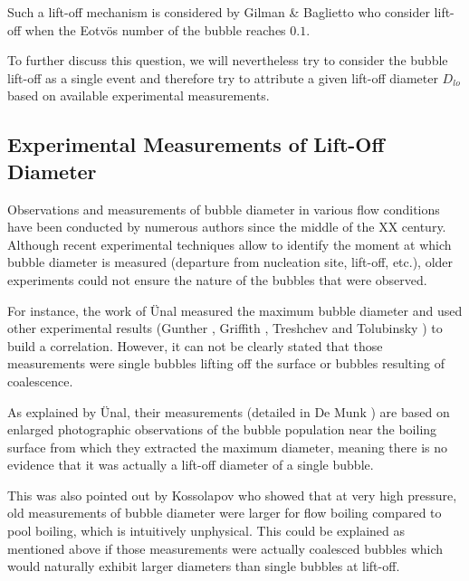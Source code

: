 \begin{note*}{}
Such a lift-off mechanism is considered by Gilman \& Baglietto \cite{gilman_self-consistent_2017} who consider lift-off when the Eotvös number of the bubble reaches $0.1$.
\end{note*}

\npar

To further discuss this question, we will nevertheless try to consider the bubble lift-off as a single event and therefore try to attribute a given lift-off diameter $D_{lo}$ based on available experimental measurements.


\subsection{Experimental Measurements of Lift-Off Diameter}

Observations and measurements of bubble diameter in various flow conditions have been conducted by numerous authors since the middle of the XX century. Although recent experimental techniques allow to identify the moment at which bubble diameter is measured (departure from nucleation site, lift-off, etc.), older experiments could not ensure the nature of the bubbles that were observed. 

\npar

For instance, the work of \"Unal \cite{unal_maximum_1976} measured the maximum bubble diameter and used other experimental results (Gunther \cite{gunther_photographic_1951}, Griffith \cite{griffith_void_1958}, Treshchev \cite{treshchev_number_1969} and Tolubinsky \cite{tolubinsky_vapour_1970}) to build a correlation. However, it can not be clearly stated that those measurements were single bubbles lifting off the surface or bubbles resulting of coalescence. 

\begin{remark*}{}
As explained by \"Unal, their measurements (detailed in De Munk \cite{munk_two-phase_1973}) are based on enlarged photographic observations of the bubble population near the boiling surface from which they extracted the maximum diameter, meaning there is no evidence that it was actually a lift-off diameter of a single bubble.
\end{remark*}



\npar

This was also pointed out by Kossolapov \cite{kossolapov_experimental_2021} who showed that at very high pressure, old measurements of bubble diameter were larger for flow boiling compared to pool boiling, which is intuitively unphysical. This could be explained as mentioned above if those measurements were actually coalesced bubbles which would naturally exhibit larger diameters than single bubbles at lift-off.  


